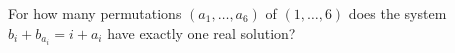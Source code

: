 For how many permutations $(a_1,\ldots,a_6)$ of $(1,\ldots,6)$ does the system $b_i+b_{a_i}=i+a_i$ have exactly one real solution?
